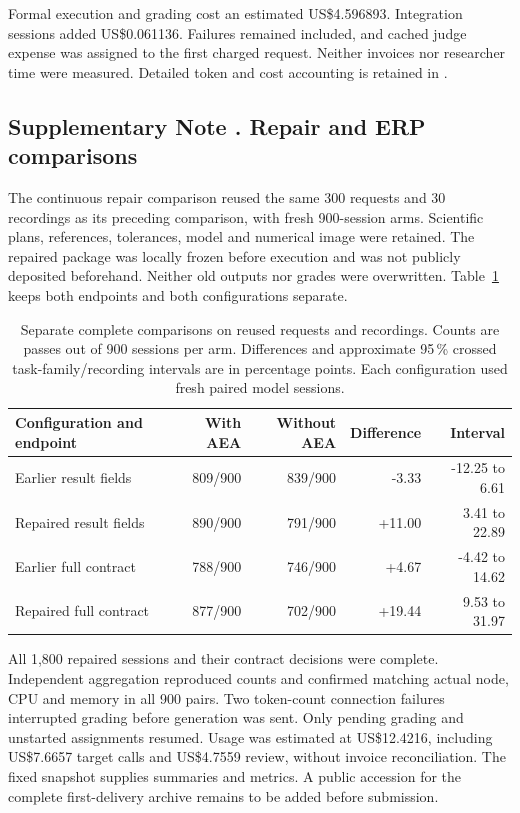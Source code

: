 Formal execution and grading cost an estimated US\$4.596893. Integration sessions added US\$0.061136. Failures remained included, and cached judge expense was assigned to the first charged request. Neither invoices nor researcher time were measured. Detailed token and cost accounting is retained in .

\subsection*{Supplementary Note \thesuppnote. Repair and ERP comparisons}
\label{si:repair-validation}
\label{si:erp-paired}

The continuous repair comparison reused the same 300 requests and 30 recordings as its preceding comparison, with fresh 900-session arms. Scientific plans, references, tolerances, model and numerical image were retained. The repaired package was locally frozen before execution and was not publicly deposited beforehand. Neither old outputs nor grades were overwritten. Table~\ref*{tab:repair-validation} keeps both endpoints and both configurations separate.
\begin{table}[!htbp]
\centering\small
\caption{Separate complete comparisons on reused requests and recordings. Counts are passes out of 900 sessions per arm. Differences and approximate 95\,\% crossed task-family/recording intervals are in percentage points. Each configuration used fresh paired model sessions.}
\label{tab:repair-validation}
\begin{tabular}{lrrrr}
\toprule
Configuration and endpoint & With AEA & Without AEA & Difference & Interval \\
\midrule
Earlier result fields & 809/900 & 839/900 & -3.33 & -12.25 to 6.61 \\
Repaired result fields & 890/900 & 791/900 & +11.00 & 3.41 to 22.89 \\
Earlier full contract & 788/900 & 746/900 & +4.67 & -4.42 to 14.62 \\
Repaired full contract & 877/900 & 702/900 & +19.44 & 9.53 to 31.97 \\
\bottomrule
\end{tabular}
\end{table}

All 1,800 repaired sessions and their contract decisions were complete. Independent aggregation reproduced counts and confirmed matching actual node, CPU and memory in all 900 pairs. Two token-count connection failures interrupted grading before generation was sent. Only pending grading and unstarted assignments resumed. Usage was estimated at US\$12.4216, including US\$7.6657 target calls and US\$4.7559 review, without invoice reconciliation. The fixed snapshot supplies summaries and metrics. A public accession for the complete first-delivery archive remains to be added before submission.

